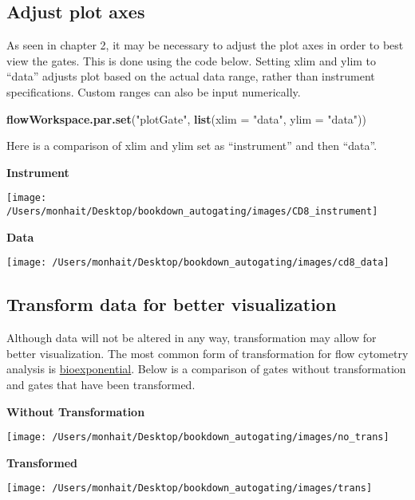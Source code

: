\documentclass[]{book}
\newenvironment{Shaded}{\begin{snugshade}}{\end{snugshade}}
\newcommand{\DataTypeTok}[1]{\textcolor[rgb]{0.13,0.29,0.53}{#1}}
\newcommand{\KeywordTok}[1]{\textcolor[rgb]{0.13,0.29,0.53}{\textbf{#1}}}
\newcommand{\NormalTok}[1]{#1}
\newcommand{\StringTok}[1]{\textcolor[rgb]{0.31,0.60,0.02}{#1}}
\begin{document}
\hypertarget{adjust-plot-axes}{%
\subsection{Adjust plot axes}\label{adjust-plot-axes}}

As seen in chapter 2, it may be necessary to adjust the plot axes in order to best view the gates. This is done using the code below. Setting xlim and ylim to ``data'' adjusts plot based on the actual data range, rather than instrument specifications. Custom ranges can also be input numerically.

\begin{Shaded}
\begin{Highlighting}[]
\KeywordTok{flowWorkspace.par.set}\NormalTok{(}\StringTok{"plotGate"}\NormalTok{, }\KeywordTok{list}\NormalTok{(}\DataTypeTok{xlim =} \StringTok{"data"}\NormalTok{,}
                                       \DataTypeTok{ylim =} \StringTok{"data"}\NormalTok{))}
\end{Highlighting}
\end{Shaded}

Here is a comparison of xlim and ylim set as ``instrument'' and then ``data''.

\textbf{Instrument}

\texttt{[image: /Users/monhait/Desktop/bookdown\_autogating/images/CD8\_instrument]}

\textbf{Data}

\texttt{[image: /Users/monhait/Desktop/bookdown\_autogating/images/cd8\_data]}

\hypertarget{transform-data-for-better-visualization}{%
\subsection{Transform data for better visualization}\label{transform-data-for-better-visualization}}

Although data will not be altered in any way, transformation may allow for better visualization. The most common form of transformation for flow cytometry analysis is \href{http://docs.flowjo.com/vx/graphs-and-gating/gw-transform-overview/}{bioexponential}. Below is a comparison of gates without transformation and gates that have been transformed.

\textbf{Without Transformation}

\texttt{[image: /Users/monhait/Desktop/bookdown\_autogating/images/no\_trans]}

\textbf{Transformed}

\texttt{[image: /Users/monhait/Desktop/bookdown\_autogating/images/trans]}
\end{document}
